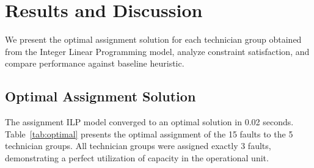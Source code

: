 \documentclass[11pt]{article}
\begin{document}



\section*{Results and Discussion}

We present the optimal assignment solution for each technician group obtained from the Integer Linear Programming model, analyze constraint satisfaction, and compare performance against baseline heuristic. 

\subsection*{Optimal Assignment Solution}

The assignment ILP model converged to an optimal solution in 0.02 seconds. Table~\ref{tab:optimal} presents the optimal assignment of the 15 faults to the 5 technician groups. All technician groups were assigned exactly 3 faults, demonstrating a perfect utilization of capacity in the operational unit.
\end{document}
